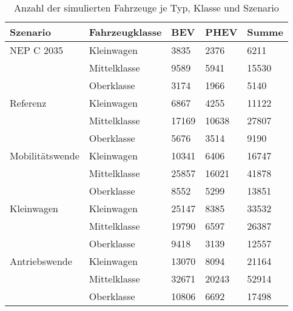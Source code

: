 {
\renewcommand{\arraystretch}{1.2}%
\begin{table}[H]
	\begin{center}
		\caption{Anzahl der simulierten Fahrzeuge je Typ, Klasse und Szenario}
		\begin{tabu} to \textwidth {X[1] X[1] X[1, r] X[1, r] X[1, r]}
			\hline
			Szenario         & Fahrzeugklasse & BEV         & PHEV        & Summe       \\ \hline
			NEP C \num{2035} & Kleinwagen     & \num{3835}  & \num{2376}  & \num{6211}  \\
							 & Mittelklasse   & \num{9589}  & \num{5941}  & \num{15530} \\
							 & Oberklasse     & \num{3174}  & \num{1966}  & \num{5140}  \\ \hline
			Referenz         & Kleinwagen     & \num{6867}  & \num{4255}  & \num{11122} \\
							 & Mittelklasse   & \num{17169} & \num{10638} & \num{27807} \\
							 & Oberklasse     & \num{5676}  & \num{3514}  & \num{9190}  \\ \hline
			Mobilitätswende  & Kleinwagen     & \num{10341} & \num{6406}  & \num{16747} \\
							 & Mittelklasse   & \num{25857} & \num{16021} & \num{41878} \\
							 & Oberklasse     & \num{8552}  & \num{5299}  & \num{13851} \\ \hline
			Kleinwagen       & Kleinwagen     & \num{25147} & \num{8385}  & \num{33532} \\
							 & Mittelklasse   & \num{19790} & \num{6597}  & \num{26387} \\
							 & Oberklasse     & \num{9418}  & \num{3139}  & \num{12557} \\ \hline
			Antriebswende    & Kleinwagen     & \num{13070} & \num{8094}  & \num{21164} \\
							 & Mittelklasse   & \num{32671} & \num{20243} & \num{52914} \\
							 & Oberklasse     & \num{10806} & \num{6692}  & \num{17498} \\ \hline
		\end{tabu}
		\label{tab:car_count_long}
	\end{center}
	\vspace{-3mm}%
\end{table}
}